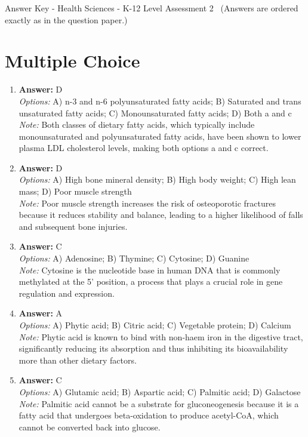 \documentclass[12pt]{article}
\begin{document}
\begin{center}
Answer Key - Health Sciences - K-12 Level Assessment 2 \
\small (Answers are ordered exactly as in the question paper.)
\end{center}

\section*{Multiple Choice}
\begin{enumerate}[label=\arabic*.]
\item \textbf{Answer:} D
\\ \textit{Options:} A) n-3 and n-6 polyunsaturated fatty acids; B) Saturated and trans unsaturated fatty acids; C) Monounsaturated fatty acids; D) Both a and c
\\ \textit{Note:} Both classes of dietary fatty acids, which typically include monounsaturated and polyunsaturated fatty acids, have been shown to lower plasma LDL cholesterol levels, making both options a and c correct.
\item \textbf{Answer:} D
\\ \textit{Options:} A) High bone mineral density; B) High body weight; C) High lean mass; D) Poor muscle strength
\\ \textit{Note:} Poor muscle strength increases the risk of osteoporotic fractures because it reduces stability and balance, leading to a higher likelihood of falls and subsequent bone injuries.
\item \textbf{Answer:} C
\\ \textit{Options:} A) Adenosine; B) Thymine; C) Cytosine; D) Guanine
\\ \textit{Note:} Cytosine is the nucleotide base in human DNA that is commonly methylated at the 5' position, a process that plays a crucial role in gene regulation and expression.
\item \textbf{Answer:} A
\\ \textit{Options:} A) Phytic acid; B) Citric acid; C) Vegetable protein; D) Calcium
\\ \textit{Note:} Phytic acid is known to bind with non-haem iron in the digestive tract, significantly reducing its absorption and thus inhibiting its bioavailability more than other dietary factors.
\item \textbf{Answer:} C
\\ \textit{Options:} A) Glutamic acid; B) Aspartic acid; C) Palmitic acid; D) Galactose
\\ \textit{Note:} Palmitic acid cannot be a substrate for gluconeogenesis because it is a fatty acid that undergoes beta-oxidation to produce acetyl-CoA, which cannot be converted back into glucose.
\end{enumerate}
\end{document}
